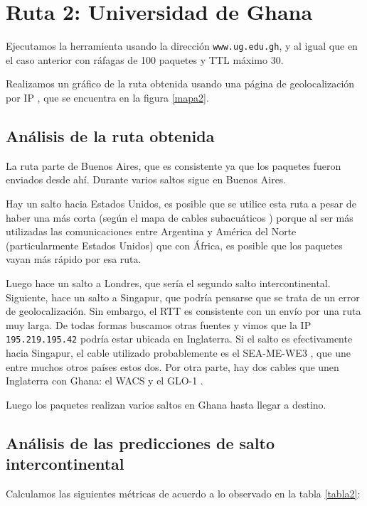 \section{Ruta 2: Universidad de Ghana}

Ejecutamos la herramienta usando la dirección \texttt{www.ug.edu.gh}, y al igual que en el caso anterior con ráfagas de 100 paquetes y TTL máximo 30.

Realizamos un gráfico de la ruta obtenida usando una página de geolocalización por IP \cite{ip2location}, que se encuentra en la figura \ref{mapa2}.

\subsection{Análisis de la ruta obtenida}

La ruta parte de Buenos Aires, que es consistente ya que los paquetes fueron enviados desde ahí. Durante varios saltos sigue en Buenos Aires.

Hay un salto hacia Estados Unidos, es posible que se utilice esta ruta a pesar de haber una más corta (según el mapa de cables subacuáticos \cite{cables}) porque al ser más utilizadas las comunicaciones entre Argentina y América del Norte (particularmente Estados Unidos) que con África, es posible que los paquetes vayan más rápido por esa ruta.

Luego hace un salto a Londres, que sería el segundo salto intercontinental. Siguiente, hace un salto a Singapur, que podría pensarse que se trata de un error de geolocalización. Sin embargo, el RTT es consistente con un envío por una ruta muy larga. De todas formas buscamos otras fuentes y vimos que la IP \texttt{195.219.195.42} podría estar ubicada en Inglaterra. Si el salto es efectivamente hacia Singapur, el cable utilizado probablemente es el SEA-ME-WE3 \cite{seamewe}, que une entre muchos otros países estos dos. Por otra parte, hay dos cables que unen Inglaterra con Ghana: el WACS \cite{wacs} y el GLO-1 \cite{glo1}.

Luego los paquetes realizan varios saltos en Ghana hasta llegar a destino. 

\subsection{Análisis de las predicciones de salto intercontinental}

Calculamos las siguientes métricas de acuerdo a lo observado en la tabla \ref{tabla2}:

